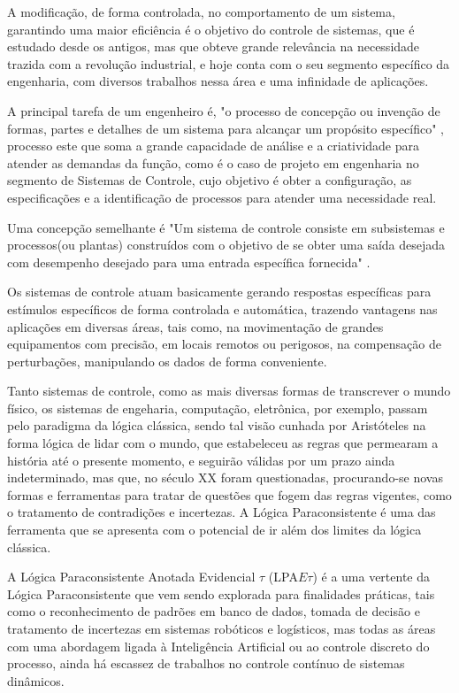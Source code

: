 A modificação, de forma controlada, no comportamento de um sistema, garantindo uma maior eficiência é o objetivo do controle de sistemas, que é estudado desde os antigos, mas que obteve grande relevância na necessidade trazida com a revolução industrial, e hoje conta com o seu segmento específico da engenharia, com diversos trabalhos nessa área e uma infinidade de aplicações. 
 

A principal tarefa de um engenheiro é,
"o processo de concepção ou invenção de formas, partes e detalhes de
um sistema para alcançar um propósito específico"
\cite{dorf2011modern},
processo este que soma a grande capacidade de análise e a criatividade para atender as demandas da função, como é o caso de projeto em engenharia no segmento de Sistemas de Controle, cujo objetivo é obter a configuração, as especificações e a identificação de processos para atender uma necessidade real. 


Uma concepção semelhante é
"Um sistema de controle consiste em subsistemas e processos(ou plantas) construídos com o objetivo de se obter uma saída desejada com desempenho desejado para uma entrada específica fornecida"
\cite{nise2009engenharia}.


Os sistemas de controle atuam basicamente gerando respostas específicas para estímulos específicos de forma controlada e automática, trazendo vantagens nas aplicações em diversas áreas, tais como, 
na movimentação de grandes equipamentos com precisão, em locais remotos ou perigosos, na compensação de perturbações, manipulando os dados de forma conveniente.



Tanto sistemas de controle, como as mais diversas formas de transcrever o mundo físico, os sistemas de engeharia, computação, eletrônica, por exemplo, passam pelo paradigma da lógica clássica, sendo tal visão cunhada por Aristóteles na forma lógica de lidar com o mundo, que estabeleceu as regras que permearam a história até o presente momento, e seguirão válidas por um prazo ainda indeterminado, mas que, no século XX foram questionadas, procurando-se novas formas e ferramentas para tratar de questões que fogem das regras vigentes, como o tratamento de contradições e incertezas. A Lógica Paraconsistente é uma das ferramenta que se apresenta com o potencial de ir além dos limites da lógica clássica.

A Lógica Paraconsistente Anotada Evidencial $\tau$ (LPA$E\tau$) é a uma vertente da Lógica Paraconsistente que vem sendo explorada para finalidades práticas, tais como o reconhecimento de padrões em banco de dados, tomada de decisão e tratamento de incertezas em sistemas robóticos e logísticos, mas todas as áreas com uma abordagem ligada à Inteligência Artificial ou ao controle discreto do processo, ainda há escassez de trabalhos no controle contínuo de sistemas dinâmicos. 


